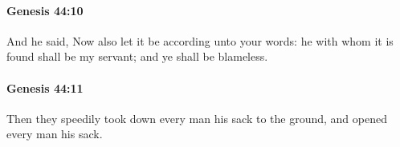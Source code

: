		\paragraph{Genesis 44:10} %
			\label{GENESIS-44-10}

			And he said, Now also let it be according unto your words: he with whom it is found shall be my servant; and ye shall be blameless.


		\paragraph{Genesis 44:11} %
			\label{GENESIS-44-11}

			Then they speedily took down every man his sack to the ground, and opened every man his sack.


